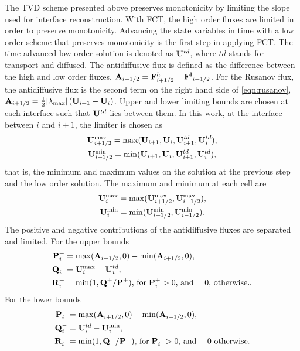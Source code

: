 The TVD scheme presented above preserves monotonicity by limiting the slope used for interface reconstruction.  With FCT, the high order fluxes are limited in order to preserve monotonicity.  Advancing the state variables in time with a low order scheme that preserves monotonicity is the first step in applying FCT.  The time-advanced low order solution is denoted as $\mathbf{U}^{td}$, where $td$ stands for transport and diffused.  The antidiffusive flux is defined as the difference between the high and low order fluxes, $\mathbf{A}_{i+1/2} = \mathbf{F}^{h}_{i+1/2} - \mathbf{F^{l}}_{i+1/2}$.  For the Rusanov flux, the antidiffusive flux is the second term on the right hand side of \eqref{eqn:rusanov}, $\mathbf{A}_{i+1/2} = \frac{1}{2}|\lambda_{\max}|\left(\mathbf{U}_{i+1} - \mathbf{U}_{i} \right)$.  Upper and lower limiting bounds are chosen at each interface such that $\mathbf{U}^{td}$ lies between them.  In this work, at the interface between $i$ and $i+1$, the limiter is chosen as
\begin{gather}
\label{eqn:fct_limit_max}
\mathbf{U}^{\max}_{i+1/2} = \max(\mathbf{U}_{i+1},\mathbf{U}_{i},\mathbf{U}^{td}_{i+1},\mathbf{U}^{td}_{i}) , \\
\label{eqn:fct_limit_min}
\mathbf{U}^{\min}_{i+1/2} = \min(\mathbf{U}_{i+1},\mathbf{U}_{i},\mathbf{U}^{td}_{i+1},\mathbf{U}^{td}_{i}) , 
\end{gather}   
that is, the minimum and maximum values on the solution at the previous step and the low order solution.  The maximum and minimum at each cell are 
\begin{gather}
\mathbf{U}^{\max}_{i} = \max(\mathbf{U}^{\max}_{i+1/2},\mathbf{U}^{\max}_{i-1/2}) , \\
\mathbf{U}^{\min}_{i} = \min(\mathbf{U}^{\min}_{i+1/2},\mathbf{U}^{\min}_{i-1/2}) .
\end{gather}   
The positive and negative contributions of the antidiffusive fluxes are separated and limited.  For the upper bounds
\begin{align}
\mathbf{P}^+_i &= \max(\mathbf{A}_{i-1/2},0) - \min(\mathbf{A}_{i+1/2},0) , \\
\mathbf{Q}^+_i &= \mathbf{U}^{\max}_i - \mathbf{U}^{td}_i , \\
\mathbf{R}^+_i &= \min(1,\mathbf{Q}^+/\mathbf{P}^+) \text{, for} \; \mathbf{P}^+_i > 0 \text{, and } \quad 0 \text{, otherwise.}.
\end{align}
For the lower bounds
\begin{align}
\mathbf{P}^-_i &= \max(\mathbf{A}_{i+1/2},0) - \min(\mathbf{A}_{i-1/2},0) , \\
\mathbf{Q}^-_i &= \mathbf{U}^{td}_i - \mathbf{U}^{\min}_i , \\
\mathbf{R}^-_i &= \min(1,\mathbf{Q}^-/\mathbf{P}^-) \text{, for} \; \mathbf{P}^-_i > 0 \text{, and } \quad 0 \text{ otherwise.}
\end{align}
